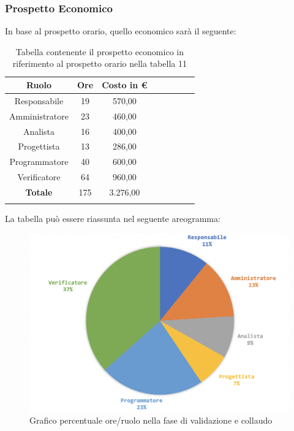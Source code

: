 		\subsubsection{Prospetto Economico}
		In base al prospetto orario, quello economico sarà il seguente: 
		
		\begin{longtable}{|c|c|c|c|c|c|c|c|}
			\hline
			\rowcolor{lighter-grayer}
			\textbf{Ruolo} & \textbf{Ore} & \textbf{Costo in € } \\
			\hline
			\endfirsthead
			
			\hline
			Responsabile 	    & 19 & 570,00\\
			\hline 
			\hline
			Amministratore	  & 23 & 460,00\\
			\hline
			\hline
			Analista 				& 16 & 400,00\\
			\hline
			\hline
			Progettista 		  & 13 & 286,00\\
			\hline
			\hline
			Programmatore 	 & 40 & 600,00\\
			\hline
			\hline
			Verificatore 		  & 64 & 960,00\\
			\hline
			\textbf{Totale} 	& 175 & 3.276,00\\
			\hline
			\caption{Tabella contenente il prospetto economico in riferimento al prospetto orario nella tabella 11}
		\end{longtable}
		\pagebreak
		
		La tabella può essere riassunta nel seguente areogramma:
		\begin{figure}[H]
			\centering
			\includegraphics[width=0.8\linewidth]{./images/validColl2.png}
			\caption{Grafico percentuale ore/ruolo nella fase di validazione e collaudo}
			\label{fig:grafico costi ruolo fase validazione e collaudo}
		\end{figure}
		

